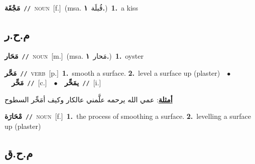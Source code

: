 \documentclass[10pt,a4paper,twoside]{article} %
\begin{document}
\begin{multicols}{2}
{\setlength\topsep{0pt}\textbf{\foreignlanguage{arabic}{مَجْقَة}}\ {\color{gray}\texttt{//}\color{black}}\ \textsc{noun}\ [f.]\ \color{gray}(msa. \foreignlanguage{arabic}{قُبلَة}~\foreignlanguage{arabic}{\textbf{١.}})\color{black}\ \textbf{1.}~a kiss\ } \vspace{2mm}

\vspace{-3mm}
\subsection*{\color{blue}\foreignlanguage{arabic}{م.ح.ر}\color{blue}{}} 

{\setlength\topsep{0pt}\textbf{\foreignlanguage{arabic}{مَحَار}}\ {\color{gray}\texttt{//}\color{black}}\ \textsc{noun}\ [m.]\ \color{gray}(msa. \foreignlanguage{arabic}{مَحار}~\foreignlanguage{arabic}{\textbf{١.}})\color{black}\ \textbf{1.}~oyster\ } \vspace{2mm}

{\setlength\topsep{0pt}\textbf{\foreignlanguage{arabic}{مَحَّر}}\ {\color{gray}\texttt{//}\color{black}}\ \textsc{verb}\ [p.]\ \textbf{1.}~smooth a surface.  \textbf{2.}~level a surface up (plaster)\ \ $\bullet$\ \ \setlength\topsep{0pt}\textbf{\foreignlanguage{arabic}{مَحِّر}}\ {\color{gray}\texttt{//}\color{black}}\ [c.]\ \ $\bullet$\ \ \setlength\topsep{0pt}\textbf{\foreignlanguage{arabic}{يمَحِّر}}\ {\color{gray}\texttt{//}\color{black}}\ [i.]\  \begin{flushright}\color{gray}\foreignlanguage{arabic}{\textbf{\underline{\foreignlanguage{arabic}{أمثلة}}}: عمي الله يرحمه علَّمني عالكار وكيف أمَحِّر السطوح}\end{flushright}\color{black}} \vspace{2mm}

{\setlength\topsep{0pt}\textbf{\foreignlanguage{arabic}{مْحَارَة}}\ {\color{gray}\texttt{//}\color{black}}\ \textsc{noun}\ [f.]\ \textbf{1.}~the process of smoothing a surface.  \textbf{2.}~levelling a surface up (plaster)\ } \vspace{2mm}

\vspace{-3mm}
\subsection*{\color{blue}\foreignlanguage{arabic}{م.ح.ق}\color{blue}{}} 


\end{multicols}
\end{document}
